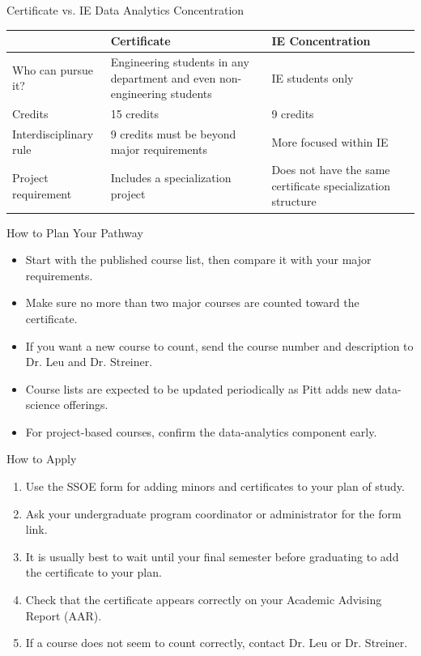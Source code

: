 \documentclass[aspectratio=169,11pt,t]{beamer}
\newcommand{\smallitem}{\setlength\itemsep{2pt}}
\begin{document}
\begin{frame}[t]{Certificate vs. IE Data Analytics Concentration}
\begin{center}
\begin{tabularx}{\textwidth}{@{}lYY@{}}
\toprule
 & \textbf{Certificate} & \textbf{IE Concentration}\\
\midrule
Who can pursue it? & Engineering students in any department and even non-engineering students & IE students only\\
Credits & 15 credits & 9 credits\\
Interdisciplinary rule & 9 credits must be beyond major requirements & More focused within IE\\
Project requirement & Includes a specialization project & Does not have the same certificate specialization structure\\
\bottomrule
\end{tabularx}
\end{center}
\end{frame}

\begin{frame}[t]{How to Plan Your Pathway}
\begin{itemize}[<+->]
  \smallitem
  \item Start with the published course list, then compare it with your major requirements.
  \item Make sure no more than two major courses are counted toward the certificate.
  \item If you want a new course to count, send the course number and description to Dr. Leu and Dr. Streiner.
  \item Course lists are expected to be updated periodically as Pitt adds new data-science offerings.
  \item For project-based courses, confirm the data-analytics component early.
\end{itemize}
\end{frame}

\begin{frame}[t]{How to Apply}
\begin{enumerate}[<+->]
  \smallitem
  \item Use the SSOE form for adding minors and certificates to your plan of study.
  \item Ask your undergraduate program coordinator or administrator for the form link.
  \item It is usually best to wait until your final semester before graduating to add the certificate to your plan.
  \item Check that the certificate appears correctly on your Academic Advising Report (AAR).
  \item If a course does not seem to count correctly, contact Dr. Leu or Dr. Streiner.
\end{enumerate}
\end{frame}
\end{document}

